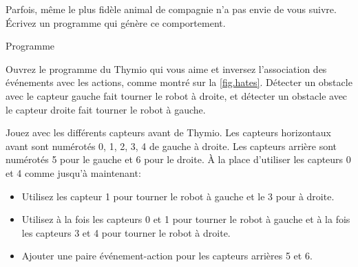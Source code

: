 



Parfois, même le plus fidèle animal de compagnie n'a pas envie de vous suivre. 
Écrivez un programme qui génère ce comportement.

{\raggedleft \hfill Programme }

Ouvrez le programme du Thymio qui vous aime et inversez l'association des événements avec les actions, comme montré sur la \cref{fig.hates}.
Détecter un obstacle avec le capteur gauche fait tourner le robot à droite, et détecter un obstacle avec le capteur droite fait tourner le robot à gauche.


{
Jouez avec les différents capteurs avant de Thymio.
Les capteurs horizontaux avant sont numérotés 0, 1, 2, 3, 4 de gauche à droite.
Les capteurs arrière sont numérotés 5 pour le gauche et 6 pour le droite.
À la place d'utiliser les capteurs 0 et 4 comme jusqu'à maintenant:
\begin{itemize}[noitemsep,nosep,leftmargin=*]
\item Utilisez les capteur 1 pour tourner le robot à gauche et le 3 pour à droite.
\item Utilisez à la fois les capteurs 0 et 1 pour tourner le robot à gauche et à la fois les capteurs 3 et 4 pour tourner le robot à droite.
\item Ajouter une paire événement-action pour les capteurs arrières 5 et 6.
\end{itemize}
}


